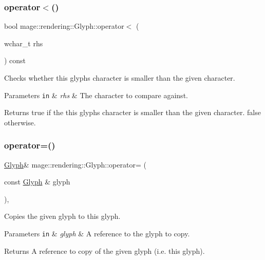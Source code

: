 \subsubsection{\texorpdfstring{operator$<$()}{operator<()}\hspace{0.1cm}{\footnotesize\ttfamily [2/2]}}
{\footnotesize\ttfamily bool mage\+::rendering\+::\+Glyph\+::operator$<$ (\begin{DoxyParamCaption}\item[{wchar\+\_\+t}]{rhs }\end{DoxyParamCaption}) const\hspace{0.3cm}{\ttfamily [noexcept]}}

Checks whether this glyph\textquotesingle{}s character is smaller than the given character.


\begin{DoxyParams}[1]{Parameters}
\mbox{\tt in}  & {\em rhs} & The character to compare against. \\
\hline
\end{DoxyParams}
\begin{DoxyReturn}{Returns}
{\ttfamily true} if the this glyph\textquotesingle{}s character is smaller than the given character. {\ttfamily false} otherwise. 
\end{DoxyReturn}
\hypertarget{structmage_1_1rendering_1_1_glyph_ae399a7c5ff5eeb842c56febd18cc16d2}{}\label{structmage_1_1rendering_1_1_glyph_ae399a7c5ff5eeb842c56febd18cc16d2} 
\subsubsection{\texorpdfstring{operator=()}{operator=()}\hspace{0.1cm}{\footnotesize\ttfamily [1/2]}}
{\footnotesize\ttfamily \hyperlink{structmage_1_1rendering_1_1_glyph}{Glyph}\& mage\+::rendering\+::\+Glyph\+::operator= (\begin{DoxyParamCaption}\item[{const \hyperlink{structmage_1_1rendering_1_1_glyph}{Glyph} \&}]{glyph }\end{DoxyParamCaption})\hspace{0.3cm}{\ttfamily [default]}, {\ttfamily [noexcept]}}

Copies the given glyph to this glyph.


\begin{DoxyParams}[1]{Parameters}
\mbox{\tt in}  & {\em glyph} & A reference to the glyph to copy. \\
\hline
\end{DoxyParams}
\begin{DoxyReturn}{Returns}
A reference to copy of the given glyph (i.\+e. this glyph). 
\end{DoxyReturn}
\hypertarget{structmage_1_1rendering_1_1_glyph_a1cac277e308a594b75308af6207a5e0a}{}\label{structmage_1_1rendering_1_1_glyph_a1cac277e308a594b75308af6207a5e0a} 
